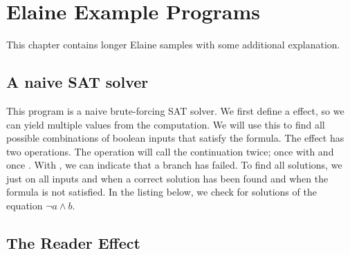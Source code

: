 \chapter{Elaine Example Programs}\label{chap:examples}

This chapter contains longer Elaine samples with some additional explanation.

\section{A naive SAT solver}\label{sec:sat}

This program is a naive brute-forcing SAT solver. We first define a  effect, so we can yield multiple values from the computation. We will use this to find all possible combinations of boolean inputs that satisfy the formula. The  effect has two operations. The  operation will call the continuation twice; once with  and once . With , we can indicate that a branch has failed. To find all solutions, we just  on all inputs and  when a correct solution has been found and  when the formula is not satisfied. In the listing below, we check for solutions of the equation $\neg a \wedge b$.


\section{The Reader Effect}\label{sec:reader}

